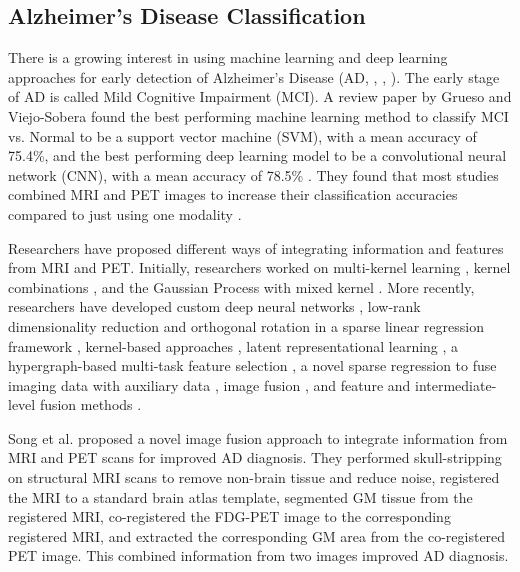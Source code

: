 \subsection{Alzheimer's Disease Classification}
There is a growing interest in using machine learning and deep learning approaches for early detection of Alzheimer's Disease (AD, \cite{lin_convolutional_2018}, \cite{grueso_machine_2021}, \cite{borchert_artificial_2021}). The early stage of AD is called Mild Cognitive Impairment (MCI). A review paper by Grueso and Viejo-Sobera found the best performing machine learning method to classify MCI vs. Normal to be a support vector machine (SVM), with a mean accuracy of 75.4\%, and the best performing deep learning model to be a convolutional neural network (CNN), with a mean accuracy of 78.5\% \cite{grueso_machine_2021}. They found that most studies combined MRI and PET images to increase their classification accuracies compared to just using one modality \cite{grueso_machine_2021}\cite{borchert_artificial_2021}.

Researchers have proposed different ways of integrating information and features from MRI and PET. Initially, researchers worked on multi-kernel learning \cite{hinrichs_predictive_2011}, kernel combinations \cite{zhang_multi-modal_2012}, and the Gaussian Process with mixed kernel \cite{young_accurate_2013}. More recently, researchers have developed custom deep neural networks \cite{lu_multimodal_2018}, low-rank dimensionality reduction and orthogonal rotation in a sparse linear regression framework \cite{zhu_low-rank_2019}, kernel-based approaches \cite{gupta_prediction_2019}, latent representational learning \cite{zhou_latent_2019}, a hypergraph-based multi-task feature selection \cite{shao_hypergraph_2020},\cite{zu_label-aligned_2016} a novel sparse regression to fuse imaging data with auxiliary data \cite{shen_heterogeneous_2021}, image fusion \cite{song_effective_2021}, and feature and intermediate-level fusion methods \cite{singh_multi-modal_2023}.

Song et al. \cite{song_effective_2021} proposed a novel image fusion approach to integrate information from MRI and PET scans for improved AD diagnosis. They performed skull-stripping on structural MRI scans to remove non-brain tissue and reduce noise, registered the MRI to a standard brain atlas template, segmented GM tissue from the registered MRI, co-registered the FDG-PET image to the corresponding registered MRI, and extracted the corresponding GM area from the co-registered PET image. This combined information from two images improved AD diagnosis.

